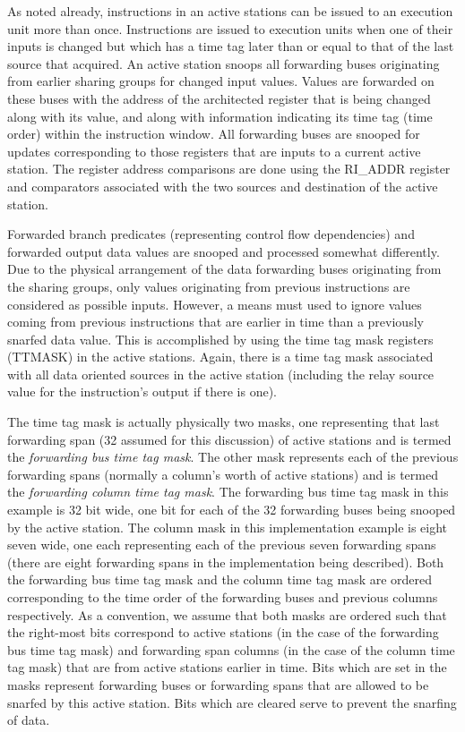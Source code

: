 As noted already, instructions in an active stations can be issued to
an execution unit more than once.  Instructions are issued to execution
units when one of their inputs is changed but which has a time tag
later than or equal to that of the last source that acquired.  An
active station snoops all forwarding buses originating from earlier
sharing groups for changed input values.  Values are forwarded on these
buses with the address of the architected register that is being
changed along with its value, and along with information indicating its
time tag (time order) within the instruction window.  All forwarding
buses are snooped for updates corresponding to those registers that are
inputs to a current active station.  The register address comparisons
are done using the RI_ADDR register and comparators associated with the
two sources and destination of the active station.

Forwarded branch predicates (representing control flow dependencies)
and forwarded output data values are snooped and processed somewhat
differently.  Due to the physical arrangement of the data forwarding
buses originating from the sharing groups, only values originating from
previous instructions are considered as possible inputs.  However, a
means must used to ignore values coming from previous instructions that
are earlier in time than a previously snarfed data value.  This is
accomplished by using the time tag mask registers (TTMASK) in the
active stations.  Again, there is a time tag mask associated with all
data oriented sources in the active station (including the relay source
value for the instruction's output if there is one).

The time tag mask is actually physically two masks, one representing
that last forwarding span (32 assumed for this discussion) of active
stations and is termed the {\it forwarding bus time tag mask}.  The
other mask represents each of the previous forwarding spans (normally a
column's worth of active stations) and is termed the {\it forwarding
column time tag mask}.  The forwarding bus time tag mask in this
example is 32 bit wide, one bit for each of the 32 forwarding buses
being snooped by the active station.  The column mask in this
implementation example is eight seven wide, one each representing each
of the previous seven forwarding spans (there are eight forwarding
spans in the implementation being described).  Both the forwarding bus
time tag mask and the column time tag mask are ordered corresponding to
the time order of the forwarding buses and previous columns
respectively.  As a convention, we assume that both masks are ordered
such that the right-most bits correspond to active stations (in the
case of the forwarding bus time tag mask) and forwarding span columns
(in the case of the column time tag mask) that are from active stations
earlier in time.  Bits which are set in the masks represent forwarding
buses or forwarding spans that are allowed to be snarfed by this active
station.  Bits which are cleared serve to prevent the snarfing of
data.

